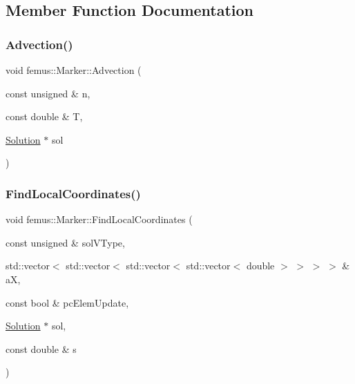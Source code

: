 \subsection{Member Function Documentation}
\mbox{\label{classfemus_1_1_marker_a3149518c1d6ee9b53189f5ee658772b7}} 
\subsubsection{\texorpdfstring{Advection()}{Advection()}}
{\footnotesize\ttfamily void femus\+::\+Marker\+::\+Advection (\begin{DoxyParamCaption}\item[{const unsigned \&}]{n,  }\item[{const double \&}]{T,  }\item[{\mbox{\hyperlink{classfemus_1_1_solution}{Solution}} $\ast$}]{sol }\end{DoxyParamCaption})}

\mbox{\label{classfemus_1_1_marker_acde02b9dad1b07381a012257218a8800}} 
\subsubsection{\texorpdfstring{Find\+Local\+Coordinates()}{FindLocalCoordinates()}}
{\footnotesize\ttfamily void femus\+::\+Marker\+::\+Find\+Local\+Coordinates (\begin{DoxyParamCaption}\item[{const unsigned \&}]{sol\+V\+Type,  }\item[{std\+::vector$<$ std\+::vector$<$ std\+::vector$<$ std\+::vector$<$ double $>$ $>$ $>$ $>$ \&}]{aX,  }\item[{const bool \&}]{pc\+Elem\+Update,  }\item[{\mbox{\hyperlink{classfemus_1_1_solution}{Solution}} $\ast$}]{sol,  }\item[{const double \&}]{s }\end{DoxyParamCaption})}

\mbox{\label{classfemus_1_1_marker_a91622587feb95d2370c17b3c863edbe2}} 
